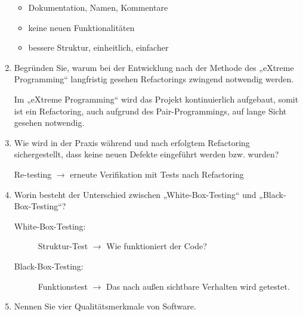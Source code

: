 \documentclass{bschlangaul-aufgabe}
\begin{document}
\begin{enumerate}
\begin{bAntwort}
\begin{itemize}
\item Dokumentation, Namen, Kommentare
\item keine neuen Funktionalitäten
\item bessere Struktur, einheitlich, einfacher
\end{itemize}
\end{bAntwort}

%

\item Begründen Sie, warum bei der Entwicklung nach der Methode des
„eXtreme Programming“ langfristig gesehen
Refactorings zwingend notwendig werden.

\begin{bAntwort}
Im „eXtreme Programming“ wird das Projekt kontinuierlich aufgebaut,
somit ist ein Refactoring, auch aufgrund des Pair-Programmings, auf
lange Sicht gesehen notwendig.
\end{bAntwort}

%

\item Wie wird in der Praxis während und nach erfolgtem Refactoring
sichergestellt, dass keine neuen Defekte eingeführt werden bzw. wurden?

\begin{bAntwort}
Re-testing $\rightarrow$ erneute Verifikation mit Tests nach Refactoring
\end{bAntwort}

%

\item Worin besteht der Unterschied zwischen
„White-Box-Testing“ und
„Black-Box-Testing“?

\begin{bAntwort}
\begin{description}
\item[White-Box-Testing:]
Struktur-Test $\rightarrow$ Wie funktioniert der Code?

\item[Black-Box-Testing:]
Funktionstest $\rightarrow$ Das nach außen sichtbare Verhalten wird
getestet.
\end{description}
\end{bAntwort}

%

\item Nennen Sie vier Qualitätsmerkmale von Software.


\end{enumerate}
\end{document}
